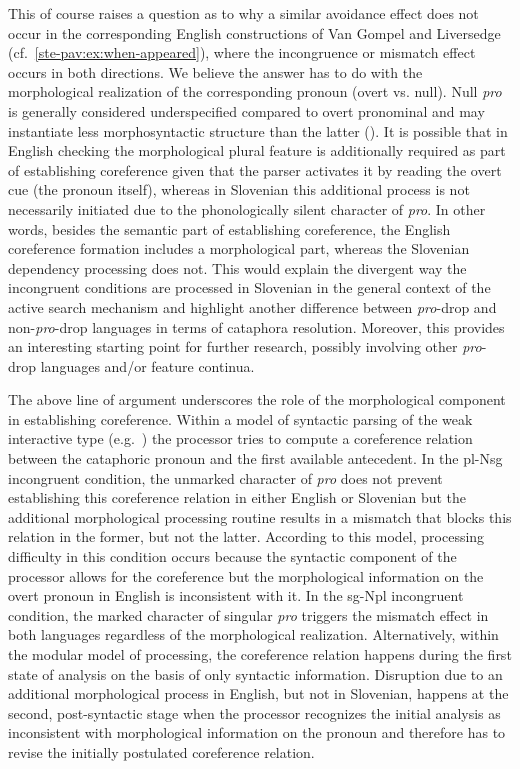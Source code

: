 \documentclass[output=paper,colorlinks,citecolor=brown]{langscibook}
\begin{document}
This of course raises a question as to why a similar avoidance effect does not occur in the corresponding English constructions of Van Gompel and Liversedge (cf.\ \ref{ste-pav:ex:when-appeared}), where the incongruence or mismatch effect occurs in both directions. We believe the answer has to do with the morphological realization of the corresponding pronoun (overt vs. null). Null \textit{pro} is generally considered underspecified compared to overt pronominal and may instantiate less morphosyntactic structure than the latter (\citealt{cardinaletti1999}). It is possible that in English checking the morphological plural feature is additionally required as part of establishing coreference given that the parser activates it by reading the overt cue (the pronoun itself), whereas in Slovenian this additional process is not necessarily initiated due to the phonologically silent character of \textit{pro}. In other words, besides the semantic part of establishing coreference, the English coreference formation includes a morphological part, whereas the Slovenian dependency processing does not. This would explain the divergent way the incongruent conditions are processed in Slovenian in the general context of the active search mechanism and highlight another difference between \textit{pro}-drop and non-\textit{pro}-drop languages in terms of cataphora resolution. Moreover, this provides an interesting starting point for further research, possibly involving other \textit{pro}-drop languages and\slash or feature continua.

The above line of argument underscores the role of the morphological component in establishing coreference. Within a model of syntactic parsing of the weak interactive type (e.g.\ \citealt{altmann1988}) the processor tries to compute a coreference relation between the cataphoric pronoun and the first available antecedent. In the pl-Nsg incongruent condition, the unmarked character of \textit{pro} does not prevent establishing this coreference relation in either English or Slovenian but the additional morphological processing routine results in a mismatch that blocks this relation in the former, but not the latter. According to this model, processing difficulty in this condition occurs because the syntactic component of the processor allows for the coreference but the morphological information on the overt pronoun in English is inconsistent with it. In the sg-Npl incongruent condition, the marked character of singular \textit{pro} triggers the mismatch effect in both languages regardless of the morphological realization. Alternatively, within the modular model of processing, the coreference relation happens during the first state of analysis on the basis of only syntactic information. Disruption due to an additional morphological process in English, but not in Slovenian, happens at the second, post-syntactic stage when the processor recognizes the initial analysis as inconsistent with morphological information on the pronoun and therefore has to revise the initially postulated coreference relation.
\end{document}
